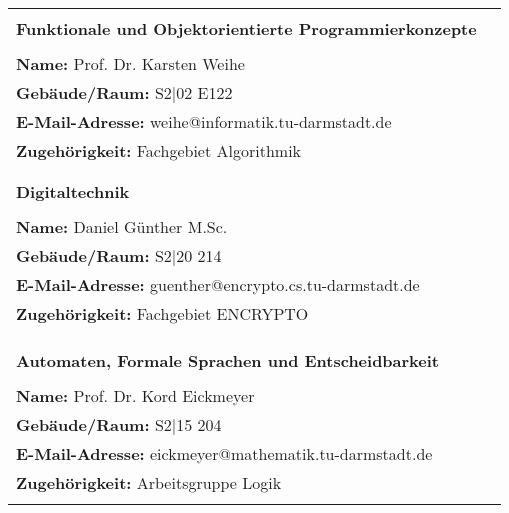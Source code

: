\begin{tabular}{lc}

                                                                  &                   \\
    \textbf{Funktionale und Objektorientierte Programmierkonzepte}
    & \multirow{4}{*}{} \\
                                                                  &                   \\
    \textbf{Name:} Prof. Dr. Karsten Weihe                        &                   \\
    \textbf{Gebäude/Raum:} S2$|$02 E122                           &                   \\
    \textbf{E-Mail-Adresse:} weihe@informatik.tu-darmstadt.de     &                   \\
    \textbf{Zugehörigkeit:} Fachgebiet Algorithmik                &                   \\

                                                                  & \\&               \\
    \textbf{Digitaltechnik}
    & \multirow{4}{*}{} \\
                                                                  &                   \\
    \textbf{Name:} Daniel Günther M.Sc.                           &                   \\
    \textbf{Gebäude/Raum:} S2|20 214                              &                   \\
    \textbf{E-Mail-Adresse:} guenther@encrypto.cs.tu-darmstadt.de &                   \\
    \textbf{Zugehörigkeit:} Fachgebiet ENCRYPTO                   &                   \\
                                                                  &                   \\

                                                                  & \\&               \\
    \textbf{Automaten, Formale Sprachen und Entscheidbarkeit}
    & \multirow{4}{*}{} \\
                                                                  &                   \\
    \textbf{Name:} Prof. Dr. Kord Eickmeyer                       &                   \\
    \textbf{Gebäude/Raum:} S2$|$15 204                            &                   \\
    \textbf{E-Mail-Adresse:} eickmeyer@mathematik.tu-darmstadt.de &                   \\
    \textbf{Zugehörigkeit:} Arbeitsgruppe Logik                   &                   \\
                                                                  &                   \\


\end{tabular}
